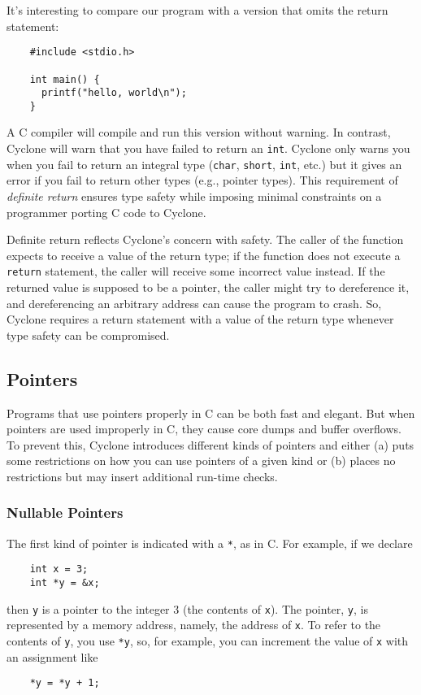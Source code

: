 It's interesting to compare our program with a version that omits the
return statement:
\begin{verbatim}
    #include <stdio.h>

    int main() {
      printf("hello, world\n");
    }
\end{verbatim}

A C compiler will compile and run this version without warning.  
In contrast, Cyclone will warn that you have failed to return
an \texttt{int}.  Cyclone only warns you when you fail to return
an integral type (\texttt{char}, \texttt{short}, \texttt{int}, etc.) 
but it gives an error if you fail to return
other types (e.g., pointer types).  This requirement of
\emph{definite return} ensures type safety while imposing
minimal constraints on a programmer porting C code to Cyclone.

Definite return reflects Cyclone's concern with safety.  The caller of
the function expects to receive a value of the return type; if the
function does not execute a \texttt{return} statement, the caller will
receive some incorrect value instead.  If the returned value is supposed
to be a pointer, the caller might try to dereference it, and
dereferencing an arbitrary address can cause the program to crash.  So,
Cyclone requires a return statement with a value of the return
type whenever type safety can be compromised.  

\subsection{Pointers}

Programs that use pointers properly in C can be both fast and elegant.
But when pointers are used improperly in C, they cause core dumps and
buffer overflows.  To prevent this, Cyclone introduces different kinds
of pointers and either (a) puts some restrictions on how you can use pointers
of a given kind or (b) places no restrictions but may insert additional
run-time checks.

\subsubsection*{Nullable Pointers}

The first kind of pointer is indicated with a \texttt{*}, as in C\@.  For
example, if we declare
\begin{verbatim}
    int x = 3;
    int *y = &x;
\end{verbatim}
then \texttt{y} is a pointer to the integer 3 (the contents of
\texttt{x}).  The pointer, \texttt{y}, is represented by a memory
address, namely, the address of \texttt{x}.  To refer to the contents
of \texttt{y}, you use \texttt{*y}, so, for example, you can increment
the value of \texttt{x} with an assignment like
\begin{verbatim}
    *y = *y + 1;
\end{verbatim}


